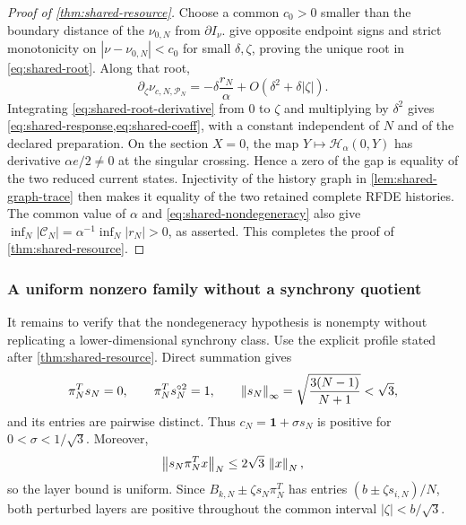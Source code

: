 \begin{proof}[Proof of \cref{thm:shared-resource}]
Choose a common \(c_0>0\) smaller than the boundary distance of the
\(\nu_{0,N}\) from \(\partial I_\nu\).
 give opposite endpoint
signs and strict monotonicity on
\(|\nu-\nu_{0,N}|<c_0\) for small \(\delta,\zeta\), proving the unique root
in \cref{eq:shared-root}.  Along that root,
\begin{equation}
 \partial_\zeta\nu_{c,N,\mathcal P_N}
 =-\delta\frac{r_N}{\alpha}
       +O(\delta^2+\delta|\zeta|).                    \label{eq:shared-root-derivative}
\end{equation}
Integrating \cref{eq:shared-root-derivative} from \(0\) to \(\zeta\) and
multiplying by \(\delta^2\) gives
\cref{eq:shared-response,eq:shared-coeff}, with a constant independent of
\(N\) and of the declared preparation.  On the section \(X=0\), the map
\(Y\mapsto\mathscr H_\alpha(0,Y)\) has derivative \(\alpha e/2\ne0\) at
the singular crossing.  Hence a zero of the gap is equality of the two
reduced current states.  Injectivity of the history graph in
\cref{lem:shared-graph-trace} then makes it equality of the two retained
complete RFDE histories.  The common value of \(\alpha\) and
\cref{eq:shared-nondegeneracy} also give
\(\inf_N|\mathscr C_N|=\alpha^{-1}\inf_N|r_N|>0\), as asserted.
This completes the proof of \cref{thm:shared-resource}.
\end{proof}

\subsubsection{A uniform nonzero family without a synchrony quotient}

It remains to verify that the nondegeneracy hypothesis is nonempty without
replicating a lower-dimensional synchrony class.  Use the explicit profile
stated after \cref{thm:shared-resource}.  Direct summation gives
\begin{equation}
 \pi_N^Ts_N=0,\qquad \pi_N^Ts_N^{\circ2}=1,\qquad
 \left\lVert s_N\right\rVert_\infty
 =\sqrt{\frac{3(N-1)}{N+1}}<\sqrt3,                  \label{eq:shared-profile-audit}
\end{equation}
and its entries are pairwise distinct.  Thus
\(c_N=\mathbf1+\sigma s_N\) is positive for
\(0<\sigma<1/\sqrt3\).  Moreover,
\[
 \left\lVert s_N\pi_N^Tx\right\rVert_N
 \le2\sqrt3\,\left\lVert x\right\rVert_N,
\]
so the layer bound is uniform.  Since
\(B_{k,N}\pm\zeta s_N\pi_N^T\) has entries
\((b\pm\zeta s_{i,N})/N\), both perturbed layers are positive throughout
the common interval \(|\zeta|<b/\sqrt3\).

